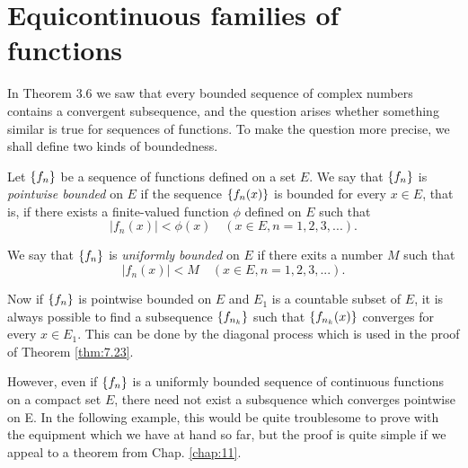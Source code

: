 \section{Equicontinuous families of functions}
In Theorem 3.6 we saw that every bounded sequence of complex numbers
contains a convergent subsequence,
and the question arises whether something similar is true for sequences of functions.
To make the question more precise,
we shall define two kinds of boundedness.

\begin{mydef}
    \label{mydef:7.19}
    Let $\protect\{f_n\}$ be a sequence of functions defined on a set $E$.
    We say that $\protect\{f_n\}$ is \emph{pointwise bounded} on $E$
    if the sequence $\protect\{f_n(x)\}$ is bounded for every $x \in E$,
    that is, if there exists a finite-valued function $\phi$ defined on $E$
    such that
    \begin{equation*}
        \left| f_n(x) \right| < \phi(x)
        \quad (x \in E, n = 1,2,3,...).
    \end{equation*}

    We say that $\protect\{f_n\}$ is \emph{uniformly bounded} on $E$ if
    there exits a number $M$ such that
    \begin{equation*}
        \left| f_n(x) \right| < M
        \quad (x \in E, n = 1,2,3,...).
    \end{equation*}
\end{mydef}


Now if $\protect\{f_n\}$ is pointwise bounded on $E$
and $E_1$ is a countable subset of $E$,
it is always possible to find a subsequence $\protect\{f_{n_k}\}$
such that $\protect\{f_{n_k}(x)\}$ converges for every $x \in E_1$.
This can be done by the diagonal process which is used in the
proof of Theorem \ref{thm:7.23}.

However, even if $\protect\{f_n\}$ is a uniformly bounded sequence of continuous functions on a compact set $E$,
there need not exist a subsquence which converges pointwise on E.
In the following example, this would be quite troublesome to prove with the equipment which we have at hand so far,
but the proof is quite simple if we appeal to a theorem from Chap. \ref{chap:11}.

